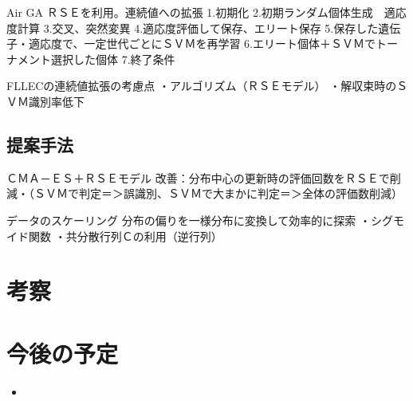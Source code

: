 \documentclass[twocolumn]{jarticle}     %
\begin{document}
Air GA
ＲＳＥを利用。連続値への拡張
1.初期化
2.初期ランダム個体生成　適応度計算
3.交叉、突然変異
4.適応度評価して保存、エリート保存
5.保存した遺伝子・適応度で、一定世代ごとにＳＶＭを再学習
6.エリート個体＋ＳＶＭでトーナメント選択した個体
7.終了条件


FLLECの連続値拡張の考慮点
・アルゴリズム（ＲＳＥモデル）
・解収束時のＳＶＭ識別率低下

\subsection{提案手法}
ＣＭＡ－ＥＳ＋ＲＳＥモデル
改善：分布中心の更新時の評価回数をＲＳＥで削減・（ＳＶＭで判定＝＞誤識別、ＳＶＭで大まかに判定＝＞全体の評価数削減）

データのスケーリング
分布の偏りを一様分布に変換して効率的に探索
・シグモイド関数
・共分散行列Ｃの利用（逆行列）


\section{考察}


\section{今後の予定}
\begin{itemize}
	\item {}
\end{itemize}



\end{document}
